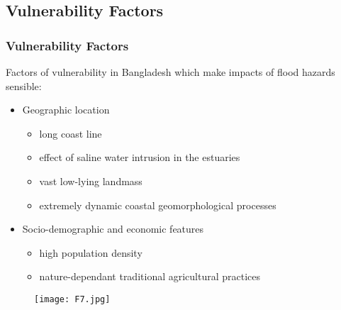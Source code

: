 \documentclass[pdflatex,compress,8pt,
	xcolor={dvipsnames,dvipsnames,svgnames,x11names,table},
	hyperref={colorlinks = true,breaklinks = true, urlcolor = NavyBlue, breaklinks = true}]{beamer}
\begin{document}
\subsection{Vulnerability Factors}
\begin{frame}\frametitle{Vulnerability Factors}
Factors of vulnerability in Bangladesh which make impacts of flood hazards sensible:
\begin{itemize}
	\item Geographic location
	\begin{itemize}
		\item long coast line
		\item effect of saline water intrusion in the estuaries
		\item vast low-lying landmass
		\item extremely dynamic coastal geomorphological processes
	\end{itemize}
	\item Socio-demographic and economic features
	\begin{itemize}
		\item high population density
		\item nature-dependant traditional agricultural practices
	\end{itemize}
\end{itemize}
\begin{figure}[H]
	\centering
		\texttt{[image: F7.jpg]}
\end{figure}
\end{frame} 
\end{document}
